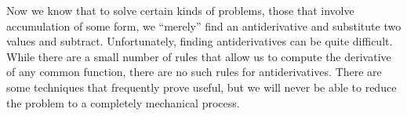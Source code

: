 \documentclass{ximera}
\begin{document}
Now we know that to solve certain kinds of problems, those that
involve accumulation of some form, we ``merely'' find an
antiderivative and substitute two values and subtract. Unfortunately,
finding antiderivatives can be quite difficult. While there are a
small number of rules that allow us to compute the derivative of any
common function, there are no such rules for antiderivatives. There
are some techniques that frequently prove useful, but we will never be
able to reduce the problem to a completely mechanical process.
\end{document}
